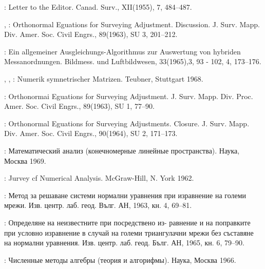 \begin{enumerate}[label={[\arabic*]}]
\item {}: Letter to the Editor. Canad. Surv., XII(1955),
  7, 484--487.

\item {}, : Orthonormal Eguations for
  Surveying Adjustment. Discussion. J. Surv. Mapp.
  Div. Amer. Soc. Civil Engrs.,  89(1963), SU 3, 201--212.

\item {}: Ein allgemeiner Ausgleichungs-Algorithmus zur
  Auswertung von hybriden Messanordnungen. Bildmess. und
  Luftbildwesen, 33(1965),3, 93 - 102, 4, 173--176.

\item {}, , :
  Numerik symnetrischer Matrizen. Teubner, Stuttgart 1968.

\item {}: Orthonormai Eguations for Surveying
  Adjustment. J.  Surv. Mapp. Div. Proc. Amer. Soc. Civil Engrs.,
  89(1963), SU 1, 77--90.

\item {}: Orthonormal Eguations for Surveying
  Adjustments. Closure. J. Surv. Mapp. Div. Amer. Soc. Civil Engrs.,
  90(1964), SU 2, 171--173.

\item {}: Математический анализ
(конечномерные линейные пространства). Наука, Москва 1969.

\item {}: Jurvey cf Numerical Analysis. McGraw-Hill,
  N. York 1962.


\item {}:  Метод за решаване системи нормални
  уравнения при изравнение на големи
  мрежи. Изв. центр. лаб. геод. Вълг. АН, 1963, кн. 4, 69--81.

\item {}: Определяне на неизвестните при посредствено из-
равнение и на поправките при условно изравнение в случай на
големи триангулачни мрежи без съставяне на нормални уравнения.
Изв. центр. лаб. геод. Бълг. АН, 1965, кн. 6, 79--90.

\item {}: Численные методы алгебры (теория и
  алгорифмы).  Наука, Москва 1966.


\end{enumerate}
